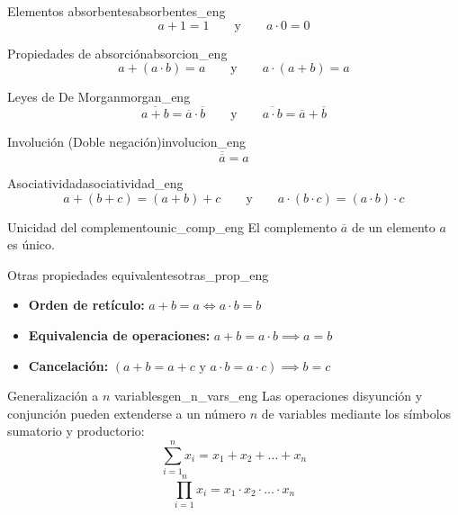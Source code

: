 \setcounter{tcb@cnt@teorema}{2}
\begin{teorema}{Elementos absorbentes}{absorbentes_eng}
\[ a + 1 = 1 \qquad \text{y} \qquad a \cdot 0 = 0 \]
\end{teorema}

\setcounter{tcb@cnt@teorema}{5}
\begin{teorema}{Propiedades de absorción}{absorcion_eng}
\[ a + (a \cdot b) = a \qquad \text{y} \qquad a \cdot (a + b) = a \]
\end{teorema}

\setcounter{tcb@cnt@teorema}{11}
\begin{teorema}{Leyes de De Morgan}{morgan_eng}
\[ \overline{a + b} = \overline{a} \cdot \overline{b} \qquad \text{y} \qquad \overline{a \cdot b} = \overline{a} + \overline{b} \]
\end{teorema}

\setcounter{tcb@cnt@teorema}{10}
\begin{teorema}{Involución (Doble negación)}{involucion_eng}
\[ \overline{\overline{a}} = a \]
\end{teorema}

\setcounter{tcb@cnt@teorema}{12}
\begin{teorema}{Asociatividad}{asociatividad_eng}
\[ a + (b + c) = (a + b) + c \qquad \text{y} \qquad a \cdot (b \cdot c) = (a \cdot b) \cdot c \]
\end{teorema}

\setcounter{tcb@cnt@teorema}{9}
\begin{teorema}{Unicidad del complemento}{unic_comp_eng}
El complemento $\overline{a}$ de un elemento $a$ es único.
\end{teorema}

\setcounter{tcb@cnt@teorema}{6}
\begin{teorema}{Otras propiedades equivalentes}{otras_prop_eng}
\begin{itemize}
    \item \textbf{Orden de retículo:} $a + b = a \iff a \cdot b = b$
    \item \textbf{Equivalencia de operaciones:} $a + b = a \cdot b \implies a = b$
    \item \textbf{Cancelación:} $(a + b = a + c \text{ y } a \cdot b = a \cdot c) \implies b = c$
\end{itemize}
\end{teorema}

\setcounter{tcb@cnt@definicion}{0}
\begin{definicion}{Generalización a $n$ variables}{gen_n_vars_eng}
Las operaciones disyunción y conjunción pueden extenderse a un número $n$ de variables mediante los símbolos sumatorio y productorio:
\[ \sum_{i=1}^{n} x_i = x_1 + x_2 + \dots + x_n \]
\[ \prod_{i=1}^{n} x_i = x_1 \cdot x_2 \cdot \dots \cdot x_n \]
\end{definicion}

